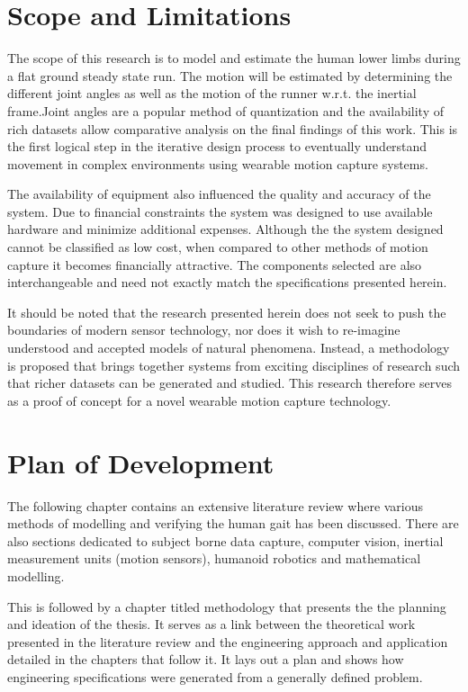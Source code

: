 \section{Scope and Limitations}
The scope of this research is to model and estimate the human lower limbs during a flat ground steady state run. The motion will be estimated by determining the different joint angles as well as the motion of the runner w.r.t. the inertial frame.Joint angles are a popular method of quantization and the availability of rich datasets allow comparative analysis on the final findings of this work. This is the first logical step in the iterative design process to eventually understand movement in complex environments using wearable motion capture systems.

The availability of equipment also influenced the quality and accuracy of the system. Due to financial constraints the system was designed to use available hardware and minimize additional expenses. Although the the system designed cannot be classified as low cost, when compared to other methods of motion capture it becomes financially attractive. The components selected are also interchangeable and need not exactly match the specifications presented herein.

It should be noted that the research presented herein does not seek to push the boundaries of modern sensor technology, nor does it wish to re-imagine understood and accepted models of natural phenomena. Instead, a methodology is proposed that brings together systems from exciting disciplines of research such that richer datasets can be generated and studied. This research therefore serves as a proof of concept for a novel wearable motion capture technology.

\section{Plan of Development}
The following chapter contains an extensive literature review where various methods of modelling and verifying the human gait has been discussed. There are also sections dedicated to subject borne data capture, computer vision, inertial measurement units (motion sensors), humanoid robotics and mathematical modelling.

This is followed by a chapter titled methodology that presents the the planning and ideation of the thesis. It serves as a link between the theoretical work presented in the literature review and the engineering approach and application detailed in the chapters that follow it. It lays out a plan and shows how engineering specifications were generated from a generally defined problem. 

